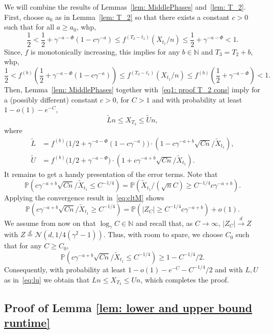 \documentclass[11pt]{article}
\newcommand{\Prob}{\mathbb{P}}
\numberwithin{theorem}{section}
\begin{document}
We will combine the results of Lemmas~\ref{lem: MiddlePhases} and~\ref{lem: T_2}. First, choose $a_0$ as in Lemma~\ref{lem: T_2} so that there exists a constant $c>0$ such that for all $a\geq a_0$, whp,
\[
    \frac{1}{2}< \frac12 + \gamma^{-a-\Phi} (1-c\gamma^{-a}) \leq f^{(T_2-t_1)}(X_{t_1}/n) \leq \frac12 + \gamma^{-a-\Phi}< 1.
\]
Since, $f$ is monotonically increasing, this implies for any $b\in\mathbb{N}$ and $T_3=T_2+b$, whp,
\begin{equation}
\label{eq1: proof T_2 cons}
\frac{1}{2}<f^{(b)}\left(\frac12 + \gamma^{-a-\Phi} (1-c\gamma^{-a})\right) \leq f^{(T_3-t_1)}(X_{t_1}/n) \leq f^{(b)}\left(\frac12 + \gamma^{-a-\Phi}\right)<1.
\end{equation}
Then, Lemma~\ref{lem: MiddlePhases} together with~\eqref{eq1: proof T_2 cons} imply for a (possibly different) constant $c>0$, for $C > 1$ and with probability at least $1-o(1)-e^{-C}$,
\[
    \tilde L n\leq X_{T_3} \leq \tilde Un,
\]
where
\begin{equation*}
\begin{aligned}
    \tilde L &= f^{(b)}\big(1/2+\gamma^{-a-\Phi}(1-c\gamma^{-a})\big) \cdot (1-c\gamma^{-a+b}\sqrt{Cn}/\tilde X_{t_1}), \\
    \tilde U &= f^{(b)}\big(1/2+\gamma^{-a-\Phi}\big)\cdot(1+c\gamma^{-a+b}\sqrt{Cn}/\tilde X_{t_1}).
\end{aligned}
\end{equation*}
It remains to get a handy presentation of the error terms. Note that 
\[
\Prob\left(c\gamma^{-a+b}\sqrt{Cn}/\tilde X_{t_1} \leq C^{-1/4}\right) = \Prob\left( \tilde X_{t_1}/(\sqrt{n}C)\geq C^{-1/4} c\gamma^{-a+b}\right). 
\]
Applying the convergence result in~\eqref{eq:cltM} shows
\[
\Prob\left(c\gamma^{-a+b}\sqrt{Cn}/\tilde X_{t_1} \geq C^{-1/4}\right) = \Prob\left(|Z_C|\geq C^{-1/4} c\gamma^{-a+b}\right) + o(1).
\]
We assume from now on that $\log_\gamma C \in \mathbb{N}$ and recall that, as $C\to \infty$, $|Z_C|\stackrel{d}{\to} Z$ with $Z\stackrel{d}{=} \mathcal{N}(d,1/4(\gamma^2-1))$.
Thus, with room to spare, we choose $C_0$ such that for any $C\geq C_0$, 
\[
\Prob\left(c\gamma^{-a+b}\sqrt{Cn}/\tilde X_{t_1} \leq C^{-1/4}\right)\geq 1-C^{-1/4}/2.
\]
Consequently, with probability at least $1-o(1)-e^{-C}-C^{-1/4}/2$ and with $L,U$ as in~\eqref{eq:lu} we obtain that $L n\leq X_{T_3} \leq Un$, which completes the proof.


\subsection{Proof of Lemma \ref{lem: lower and upper bound runtime}}
\label{subsec: proof of lower and upper bound runtime}
\end{document}
